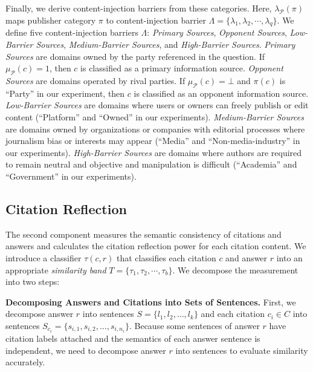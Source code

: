 Finally, we derive content-injection barriers from these categories.
Here, \( \lambda_{\mathcal{P}}(\pi) \) maps publisher category \( \pi \) to content-injection barrier \( \Lambda = \{\lambda_1, \lambda_2, \cdots, \lambda_q\} \). 
We define five content-injection barriers \( \Lambda \): \emph{Primary Sources}, \emph{Opponent Sources}, \emph{Low-Barrier Sources}, \emph{Medium-Barrier Sources}, and \emph{High-Barrier Sources}.
\emph{Primary Sources} are domains owned by the party referenced in the question. If \( \mu_{\mathcal{P}}(c) = 1 \), then \( c \) is classified as a primary information source.
\emph{Opponent Sources} are domains operated by rival parties. If \( \mu_{\mathcal{P}}(c) = \bot \) and \( \pi(c) \) is ``Party'' in our experiment, then \( c \) is classified as an opponent information source.
\emph{Low-Barrier Sources} are domains where users or owners can freely publish or edit content (``Platform'' and ``Owned'' in our experiments).
\emph{Medium-Barrier Sources} are domains owned by organizations or companies with editorial processes where journalism bias or interests may appear (``Media'' and ``Non-media-industry'' in our experiments).
\emph{High-Barrier Sources} are domains where authors are required to remain neutral and objective and manipulation is difficult (``Academia'' and ``Government'' in our experiments).


\subsection{Citation Reflection}
\label{subsec:citation_reflection}
The second component measures the semantic consistency of citations and answers and calculates the citation reflection power for each citation content.
We introduce a classifier \( \tau(c, r) \) that classifies each citation \( c \) and answer \( r \) into an appropriate \emph{similarity band} \( T = \{\tau_1, \tau_2, \cdots, \tau_b\} \).
We decompose the measurement into two steps:

\textbf{Decomposing Answers and Citations into Sets of Sentences.}
First, we decompose answer \( r \) into sentences \( S = \{l_1, l_2, \ldots, l_k\} \) and each citation \( c_i \in C \) into sentences \( S_{c_i} = \{s_{i,1}, s_{i,2}, \ldots, s_{i,n_i}\} \).
Because some sentences of answer \( r \) have citation labels attached and the semantics of each answer sentence is independent, we need to decompose answer \( r \) into sentences to evaluate similarity accurately.

